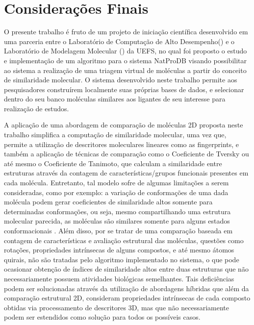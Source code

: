 \chapter{Considerações Finais}
\label{chap:conclusao}

O presente trabalho é fruto de um projeto de iniciação científica desenvolvido em uma parceria entre o Laboratório de Computação de Alto Desempenho() e o Laboratório de Modelagem Molecular () da UEFS, no qual foi proposto o estudo e implementação de um algoritmo para o sistema NatProDB visando possibilitar ao sistema a realização de uma triagem virtual de moléculas a partir do conceito de similaridade molecular. O sistema desenvolvido neste trabalho  permite aos pesquisadores construírem localmente suas próprias bases de dados, e selecionar dentro do seu banco moléculas similares aos ligantes de seu interesse para realização de estudos. 

A aplicação de uma abordagem de comparação de moléculas 2D proposta neste trabalho simplifica  a computação de similaridade molecular, uma vez que, permite a utilização de descritores moleculares lineares como as fingerprints, e também a aplicação de técnicas de comparação como o Coeficiente de Tversky ou até mesmo o Coeficiente de Tanimoto, que calculam a similaridade entre estruturas através da contagem de características/grupos funcionais presentes em cada molécula. Entretanto, tal modelo sofre de algumas limitações a serem consideradas, como por exemplo: a variação de conformações de uma dada molécula podem gerar coeficientes de similaridade altos somente para determinadas conformações, ou seja, mesmo compartilhando uma estrutura molecular parecida, as moléculas são similares somente para alguns estados conformacionais \cite{rodrigues2012}. Além disso, por se tratar de uma comparação baseada em contagem de características e avaliação estrutural das moléculas, questões como rotações, propriedades intrínsecas de alguns compostos, e até mesmo átomos quirais, não são tratadas pelo algoritmo implementado no sistema, o que pode ocasionar obtenção de índices de similaridade altos entre duas estruturas que não necessariamente possuem atividades biológicas semelhantes. Tais deficiências podem ser solucionadas através da utilização de abordagens híbridas que além da comparação estrutural 2D, consideram propriedades intrínsecas de cada composto obtidas via processamento de descritores 3D, mas que não necessariamente podem ser estendidos  como solução para todos os possíveis casos.


